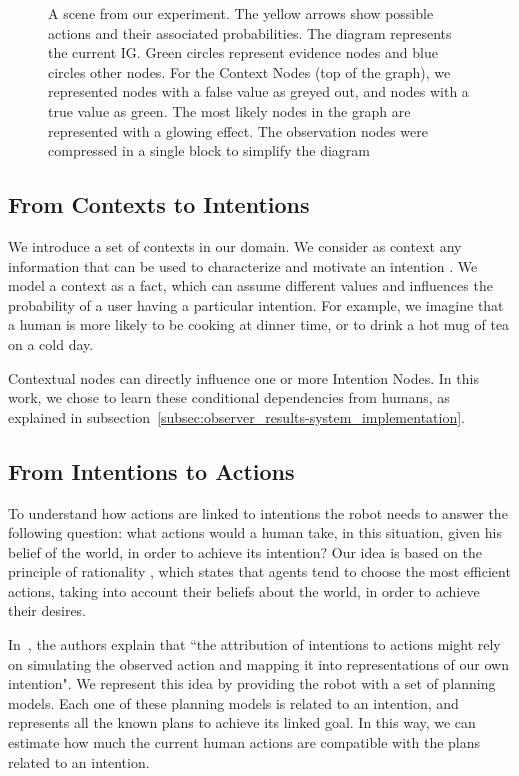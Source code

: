 \begin{figure}[ht!]
	\caption[Intention Graph]{A scene from our experiment. The yellow arrows show possible actions and their associated probabilities. The diagram represents the current IG. Green circles represent evidence nodes and blue circles other nodes. For the Context Nodes (top of the graph), we represented nodes with a false value as greyed out, and nodes with a true value as green. The most likely nodes in the graph are represented with a glowing effect. The observation nodes were compressed in a single block to simplify the diagram}
	\label{fig:intention-intention_graph}
\end{figure}


\subsection{From Contexts to Intentions}
We introduce a set of contexts in our domain. We consider as context any information that can be used to characterize and motivate an intention \citep{abowd1999towards}. We model a context  as a fact, which can assume different values and influences the probability of a user having a particular intention. For example, we imagine that a human is more likely to be cooking at dinner time, or to drink a hot mug of tea on a cold day.

Contextual nodes can directly influence one or more Intention Nodes. In this work, we chose to learn these conditional dependencies from humans, as explained in subsection~\ref{subsec:observer_results-system_implementation}.

\subsection{From Intentions to Actions}
\label{sec:intention-action_evaluation}
To understand how actions are linked to intentions the robot needs to answer the following question: what actions would a human take, in this situation, given his belief of the world, in order to achieve its intention?
Our idea is based on the principle of rationality \citep{Dennet1989}, which states that agents tend to choose the most efficient actions, taking into account their beliefs about the world, in order to achieve their desires.

In~\cite{Blakemore2001}, the authors explain that ``the attribution of intentions to actions might rely on simulating the observed action and mapping it into representations of our own intention". We represent this idea by providing the robot with a set of planning models. Each one of these planning models is related to an intention, and represents all the known plans to achieve its linked goal. In this way, we can estimate how much the current human actions are compatible with the plans related to an intention.

